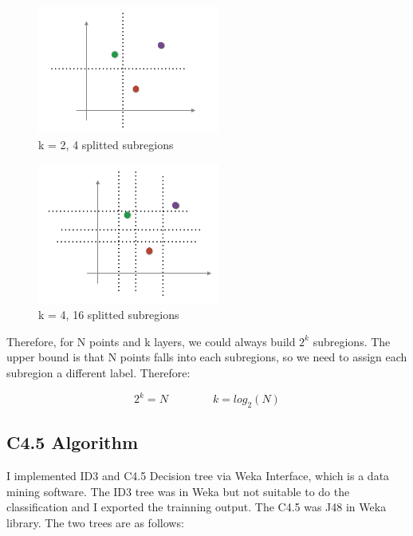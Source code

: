 \documentclass{article} %
\begin{document}
\begin{figure}[!htbp]
\begin{center}
\includegraphics[width=60mm]{pic/k2dt.png}
\end{center}
\label{fig:k2dt}
\caption{k = 2, 4 splitted subregions}
\end{figure}

\begin{figure}[!htbp]
\begin{center}
\includegraphics[width=60mm]{pic/k4dt.png}
\end{center}
\label{fig:k4dt}
\caption{k = 4, 16 splitted subregions}
\end{figure}

Therefore, for N points and k layers, we could always build $2^k$ subregions.
The upper bound is that N points falls into each subregions, so we need to
assign each subregion a different label. Therefore:

\begin{equation}
2^k = N \qquad \qquad  k = log_2(N)
\end{equation}


\subsection{C4.5 Algorithm}
I implemented ID3 and C4.5 Decision tree via Weka Interface, which is a data
mining software. The ID3 tree was in Weka but not suitable to do the
classification and I exported the trainning output. The C4.5 was J48 in Weka
library.  The two trees are as follows:
\end{document}
